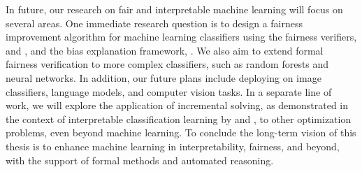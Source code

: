 In future, our research on fair and interpretable machine learning will focus on several areas. One immediate research question is to design a fairness improvement algorithm for machine learning classifiers using the fairness verifiers, {\justicia} and {\fvgm}, and the bias explanation framework, {\fairXplainer}. We also aim to extend formal fairness verification to more complex classifiers, such as random forests and neural networks. In addition, our future plans include deploying {\fairXplainer} on image classifiers, language models, and computer vision tasks. In a separate line of work, we will explore the application of incremental solving, as demonstrated in the context of interpretable classification learning by {\imli} and {\crr}, to other optimization problems, even beyond machine learning. To conclude the long-term vision of this thesis is to enhance machine learning in interpretability, fairness, and beyond, with the support of formal methods and automated reasoning.


\begin{comment}
	\begin{itemize}
		\item Fairness repair
		\item Incremental solving
		\item Fairness and interpretability as a service to more complex models.
	\end{itemize}
\end{comment}
